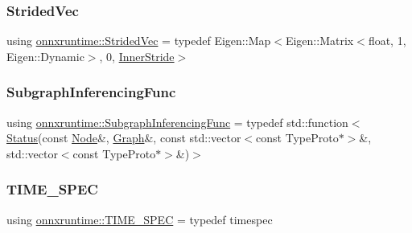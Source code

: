 \mbox{\label{namespaceonnxruntime_a04292808f038fc6b369326fecef285fd}} 
\subsubsection{\texorpdfstring{Strided\+Vec}{StridedVec}}
{\footnotesize\ttfamily using \mbox{\hyperlink{namespaceonnxruntime_a04292808f038fc6b369326fecef285fd}{onnxruntime\+::\+Strided\+Vec}} = typedef Eigen\+::\+Map$<$Eigen\+::\+Matrix$<$float, 1, Eigen\+::\+Dynamic$>$, 0, \mbox{\hyperlink{namespaceonnxruntime_aa66c7d9fd2b2c4d713447da3d8f7aa8e}{Inner\+Stride}}$>$}

\mbox{\label{namespaceonnxruntime_ae184f68a858158d9595f3fe260b05dfb}} 
\subsubsection{\texorpdfstring{Subgraph\+Inferencing\+Func}{SubgraphInferencingFunc}}
{\footnotesize\ttfamily using \mbox{\hyperlink{namespaceonnxruntime_ae184f68a858158d9595f3fe260b05dfb}{onnxruntime\+::\+Subgraph\+Inferencing\+Func}} = typedef std\+::function$<$\mbox{\hyperlink{classonnxruntime_1_1common_1_1Status}{Status}}(const \mbox{\hyperlink{classonnxruntime_1_1Node}{Node}}\&, \mbox{\hyperlink{classonnxruntime_1_1Graph}{Graph}}\&, const std\+::vector$<$const Type\+Proto$\ast$$>$\&, std\+::vector$<$const Type\+Proto$\ast$$>$\&)$>$}

\mbox{\label{namespaceonnxruntime_ab69d87fbee3d0a327786f60db7c166e7}} 
\subsubsection{\texorpdfstring{T\+I\+M\+E\+\_\+\+S\+P\+EC}{TIME\_SPEC}}
{\footnotesize\ttfamily using \mbox{\hyperlink{namespaceonnxruntime_ab69d87fbee3d0a327786f60db7c166e7}{onnxruntime\+::\+T\+I\+M\+E\+\_\+\+S\+P\+EC}} = typedef timespec}

